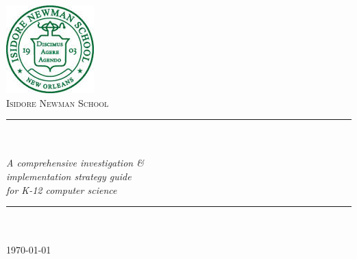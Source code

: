 \documentclass[11pt, oneside]{Thesis} %
\title{\ttitle} %
\begin{document}
\frontmatter %


\fancyhead{} %
\rhead{\thepage} %
\lhead{} %

\pagestyle{fancy} %

\newcommand{\HRule}{\rule{\linewidth}{0.5mm}} %

\hypersetup{pdfsubject=\subjectname}
\hypersetup{pdfauthor=\authornames}
\hypersetup{pdfkeywords=\keywordnames}


\begin{titlepage}
\begin{center}
\includegraphics[scale=.5]{logo.jpg}\\
\bigskip
\textsc{\large Isidore Newman School}\\[1.5cm] %
\HRule \\[0.4cm] %
{\huge \bfseries \ttitle}\\[0.4cm] %
\large \textit{ A comprehensive investigation \&\\ implementation strategy guide \\for K-12 computer science}\\[0.3cm] 
\HRule \\[1.5cm] %
\large
\emph{\authornames} \\ 
\bigskip
\bigskip 
\bigskip
\bigskip
\bigskip
{\large \today}\\[4cm] %
 
\vfill
\end{center}

\end{titlepage}
 


\end{document}
